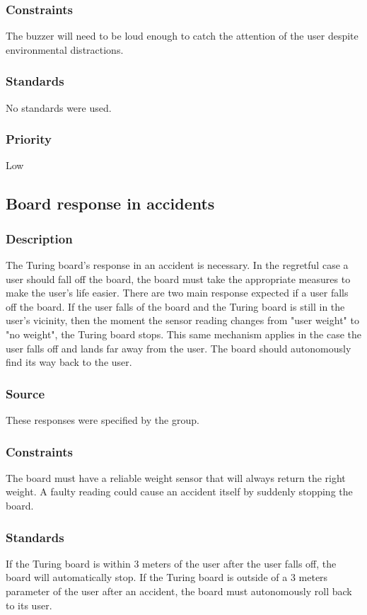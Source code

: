 \subsubsection{Constraints}
The buzzer will need to be loud enough to catch the attention of the user despite environmental distractions.
\subsubsection{Standards}
No standards were used.
\subsubsection{Priority}
Low
\subsection{Board response in accidents}
\subsubsection{Description}
The Turing board's response in an accident is necessary. In the regretful case a user should fall off the board, the board must take the appropriate measures to make the user's life easier. There are two main response expected if a user falls off the board. If the user falls of the board and the Turing board is still in the user's vicinity, then the moment the sensor reading changes from "user weight" to "no weight", the Turing board stops. This same mechanism applies in the case the user falls off and lands far away from the user. The board should autonomously find its way back to the user.
\subsubsection{Source}
These responses were specified by the group.
\subsubsection{Constraints}
The board must have a reliable weight sensor that will always return the right weight. A faulty reading could cause an accident itself by suddenly stopping the board.
\subsubsection{Standards}
If the Turing board is within 3 meters of the user after the user falls off, the board will automatically stop.\hfill \break
If the Turing board is outside of a 3 meters parameter of the user after an accident, the board must autonomously roll back to its user. 
